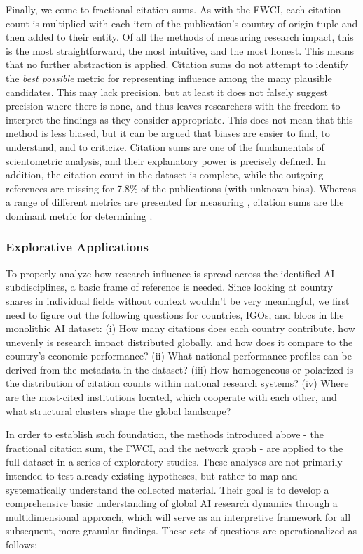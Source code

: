 \documentclass{article}
\begin{document}
	Finally, we come to fractional citation sums. As with the FWCI, each citation count is multiplied with each item of the publication's country of origin tuple and then added to their entity. Of all the methods of measuring research impact, this is the most straightforward, the most intuitive, and the most honest. This means that no further abstraction is applied. Citation sums do not attempt to identify the \textit{best possible} metric for representing influence among the many plausible candidates. This may lack precision, but at least it does not falsely suggest precision where there is none, and thus leaves researchers with the freedom to interpret the findings as they consider appropriate. This does not mean that this method is less biased, but it can be argued that biases are easier to find, to understand, and to criticize. Citation sums are one of the fundamentals of scientometric analysis, and their explanatory power is precisely defined. In addition, the citation count in the dataset is complete, while the outgoing references are missing for 7.8\% of the publications (with unknown bias). Whereas a range of different metrics are presented for measuring , citation sums are the dominant metric for determining .
	
	\subsubsection{Explorative Applications}
	
	To properly analyze how research influence is spread across the identified AI subdisciplines, a basic frame of reference is needed. Since looking at country shares in individual fields without context wouldn't be very meaningful, we first need to figure out the following questions for countries, IGOs, and blocs in the monolithic AI dataset: (i) How many citations does each country contribute, how unevenly is research impact distributed globally, and how does it compare to the country's economic performance? (ii) What national performance profiles can be derived from the metadata in the dataset? (iii) How homogeneous or polarized is the distribution of citation counts within national research systems? (iv) Where are the most-cited institutions located, which cooperate with each other, and what structural clusters shape the global landscape?
	
	In order to establish such foundation, the methods introduced above - the fractional citation sum, the FWCI, and the network graph - are applied to the full dataset in a series of exploratory studies. These analyses are not primarily intended to test already existing hypotheses, but rather to map and systematically understand the collected material. Their goal is to develop a comprehensive basic understanding of global AI research dynamics through a multidimensional approach, which will serve as an interpretive framework for all subsequent, more granular findings. These sets of questions are operationalized as follows:
	
\end{document}
